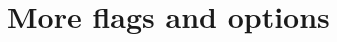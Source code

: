 \documentclass[a4paper,english,11pt]{scrartcl}
\theoremstyle{definition}
\theoremstyle{remark}
\begin{document}




\section{More flags and options}\label{sec:flags}
\end{document}
